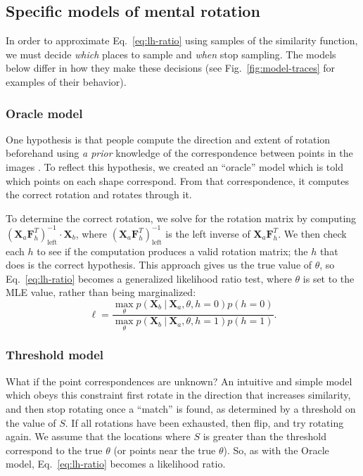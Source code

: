\documentclass[10pt,letterpaper]{article}
\newcommand{\Xa}[0]{\mathbf{X}_a}
\newcommand{\Xb}[0]{\mathbf{X}_b}
\newcommand{\F}[0]{\mathbf{F}}
\newcommand{\hi}[0]{h=0}
\newcommand{\hf}[0]{h=1}
\newcommand{\Oc}[0]{Oracle}
\begin{document}
\subsection{Specific models of mental rotation}

In order to approximate Eq.~\ref{eq:lh-ratio} using samples of the
similarity function, we must decide \textit{which} places to sample
and \textit{when} stop sampling. The models below differ in how they
make these decisions (see Fig.~\ref{fig:model-traces} for examples of
their behavior).

\subsubsection{Oracle model}

One hypothesis is that people compute the direction and extent of
rotation beforehand using \textit{a prior} knowledge of the
correspondence between points in the images
\cite{Funt:1983wn,Just:1985uu}.  To reflect this hypothesis, we
created an ``oracle'' model which is told which points on each shape
correspond. From that correspondence, it computes the correct rotation
and rotates through it.

To determine the correct rotation, we solve for the rotation matrix by
computing $(\Xa \F_h^T)_\mathrm{left}^{-1}\cdot{}\Xb$, where
$(\Xa\F_h^T)_\mathrm{left}^{-1}$ is the left inverse of
$\Xa\F_h^T$. We then check each $h$ to see if the computation produces
a valid rotation matrix; the $h$ that does is the correct
hypothesis. This approach gives us the true value of $\theta$, so
Eq.~\ref{eq:lh-ratio} becomes a generalized likelihood ratio test,
where $\theta$ is set to the MLE value, rather than being
marginalized:
\begin{equation}
  \ell = \frac{\max_\theta p(\Xb\ \vert\ \Xa, \theta, \hi)p(\hi)}{\max_\theta p(\Xb\ \vert\ \Xa, \theta, \hf)p(\hf)}.
  \label{eq:mle-lh-ratio}
\end{equation}

\subsubsection{Threshold model}

What if the point correspondences are unknown? An intuitive and simple
model which obeys this constraint first rotate in the direction that
increases similarity, and then stop rotating once a ``match'' is
found, as determined by a threshold on the value of $S$. If all
rotations have been exhausted, then flip, and try rotating again. We
assume that the locations where $S$ is greater than the threshold
correspond to the true $\theta$ (or points near the true
$\theta$). So, as with the \Oc{} model, Eq.~\ref{eq:lh-ratio} becomes
a likelihood ratio.
\end{document}
